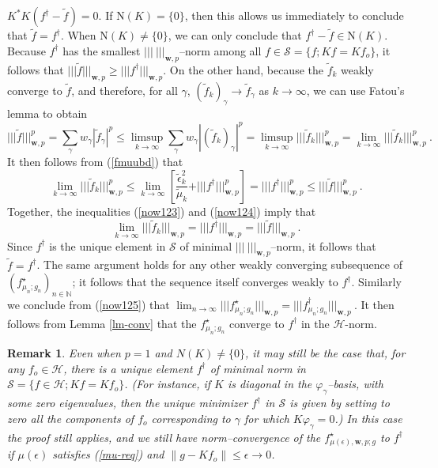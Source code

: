 \documentclass[10pt]{article}
\newtheorem{remark}[theorem]{Remark}
\newcommand{\QED}{\hfill \raisebox{-2pt}{\rule{5.6pt}{8pt}\rule{4pt}{0pt}}%
  \smallskip\par}
\def\N{\mathbb{N}}
\def\cH{\mathcal{H}}
\def\mN{\mbox{N}}
\def\K{K^*}
\def\wf{\widetilde{f}}
\def\fs{f^{\dagger}}
\def\ag{w_{\gamma}}
\def\vpg{\varphi_{\gamma}}
\def\g{\gamma}
\newcommand\eref[1]{(\ref{#1})}
\def\Vvert{\vert\!\vert\!\vert}
\begin{document}
$\K K(\fs-{\wf})=0$. If $\mN(K)=\{0\}$, then this allows us
immediately to conclude that $\wf=\fs$. When $\mN(K) \neq \{0\}$,
we can only conclude that $\fs -\wf \in \mN(K)$. Because $\fs$
has the smallest $\Vvert ~ \Vvert _{\mathbf{w},p}$--norm among all
$f \in \mathcal{S}=\{f; Kf=Kf_o\}$, it follows that
$\Vvert \wf \Vvert _{\mathbf{w},p} \geq \Vvert \fs \Vvert _{\mathbf{w},p}$.
On the other hand, because
the ${\wf}_k$ weakly converge to ${\wf}$, and therefore, for all $\g$,
$({\wf}_k)_\g \to {\wf}_\g $ as $k\to\infty$,  we
can use Fatou's lemma to obtain
\begin{equation}
\Vvert {\wf} \Vvert^p_{\mathbf{w},p} =
{\sum_\g} \ag|{\wf}_\g |^p  \leq
\limsup_{k \to\infty} {\sum_\g} \ag |({\wf}_k)_\g|^p
= \limsup_{k \to\infty}\Vvert {\wf}_k\Vvert_{\mathbf{w},p}^p
= \lim_{k \to\infty}\Vvert {\wf}_k\Vvert_{\mathbf{w},p}^p \ .
\label{now123}
\end{equation}
It then follows from (\ref{fmuubd}) that
\begin{equation}
\lim_{k \to\infty}\Vvert {\wf}_k\Vvert_{\mathbf{w},p}^p
\leq \lim_{k \to\infty}\left[\frac{\widetilde\epsilon_k^2}{ \widetilde\mu_k}
+\Vvert \fs \Vvert_{\mathbf{w},p}^p\right] = \Vvert \fs
\Vvert_{\mathbf{w},p}^p
\leq \Vvert {\wf}\Vvert_{\mathbf{w},p}^p \ .
\label{now124}
\end{equation}
Together, the inequalities (\ref{now123}) and (\ref{now124}) imply that
\begin{equation}
\lim_{k \to\infty}\Vvert {\wf}_k\Vvert_{\mathbf{w},p}
= \Vvert \fs \Vvert_{\mathbf{w},p}= \Vvert {\wf}\Vvert_{\mathbf{w},p} \ .
\label{now125}
\end{equation}
Since $\fs$ is the unique element in $\mathcal{S}$ of minimal
$\Vvert ~ \Vvert_{\mathbf{w},p}$--norm, it follows
that
${\wf}=\fs$.
The same argument holds for any other weakly converging subsequence of
$(f^\star_{\mu_n;g_n})_{n \in {\N}}$; it follows that the sequence
itself converges weakly to $\fs$.
Similarly we conclude from \eref{now125} that $\lim_{n \to \infty}
\Vvert f^\star_{\mu_n;g_n} \Vvert_{\mathbf{w},p} =
\Vvert \fs _{\mu_n;g_n} \Vvert_{\mathbf{w},p}~$.
It then follows from Lemma \ref{lm-conv} that the $f^\star_{\mu_n;g_n}$
converge to $\fs$ in the $\cH$-norm. \hfill \QED

\bigskip

\begin{remark} {\rm Even when $p=1$ and $N(K) \neq \{0\}$, it may still be the
case that, for any $f_o \in \cH$, there is a unique element $\fs$ of minimal
norm in $\mathcal{S}=\{f \in \cH; Kf=Kf_o \}$. (For instance, if
$K$ is diagonal in the $\varphi_\g$--basis, with some zero eigenvalues,
then the unique minimizer $\fs$ in $\mathcal{S}$ is given by setting to zero
all the components of $f_o$ corresponding to $\g$ for which $K \vpg = 0$.)
In this case the proof still applies, and we still have norm--convergence
of the $f^\star_{\mu(\epsilon),\mathbf{w},p;g}$ to $\fs$ if $\mu(\epsilon)$
satisfies \eref{mu-req} and $\|g -Kf_o\| \leq \epsilon \to 0$.}
\end{remark}
\end{document}
